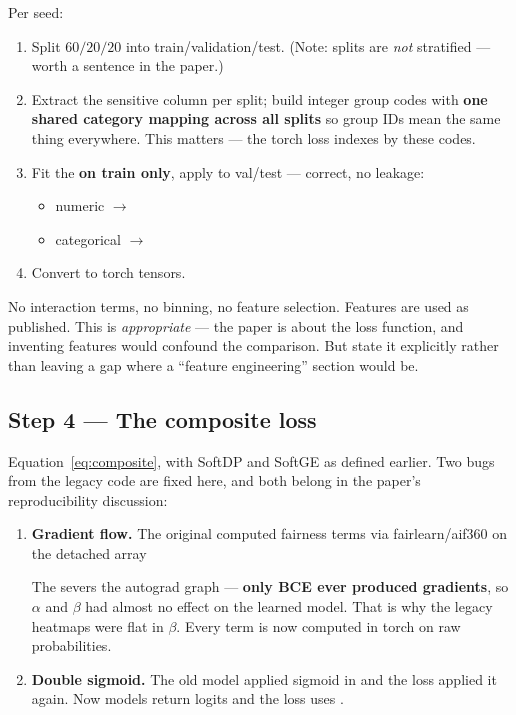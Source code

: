 Per seed:
\begin{enumerate}
\item Split $60/20/20$ into train/validation/test. (Note: splits are
\emph{not} stratified --- worth a sentence in the paper.)
\item Extract the sensitive column per split; build integer group codes with
\textbf{one shared category mapping across all splits} so group IDs mean the
same thing everywhere. This matters --- the torch loss indexes by these codes.
\item Fit the  \textbf{on train only}, apply to
val/test --- correct, no leakage:
  \begin{itemize}
  \item numeric $\to$ 
  \item categorical $\to$ 
  \end{itemize}
\item Convert to torch tensors.
\end{enumerate}

\begin{warnbox}
No interaction terms, no binning, no feature selection. Features are used as
published. This is \emph{appropriate} --- the paper is about the loss function,
and inventing features would confound the comparison. But state it explicitly
rather than leaving a gap where a ``feature engineering'' section would be.
\end{warnbox}

\subsection{Step 4 --- The composite loss}

Equation~\eqref{eq:composite}, with SoftDP and SoftGE as defined earlier. Two
bugs from the legacy code are fixed here, and both belong in the paper's
reproducibility discussion:

\begin{enumerate}
\item \textbf{Gradient flow.} The original computed fairness terms via
fairlearn/aif360 on the detached array
\begin{center}\end{center}
The  severs the autograd graph --- \textbf{only BCE ever
produced gradients}, so $\alpha$ and $\beta$ had almost no effect on the learned model.
That is why the legacy heatmaps were flat in $\beta$. Every term is now computed
in torch on raw probabilities.
\item \textbf{Double sigmoid.} The old model applied sigmoid in 
and the loss applied it again. Now models return logits and the loss uses
.
\end{enumerate}

